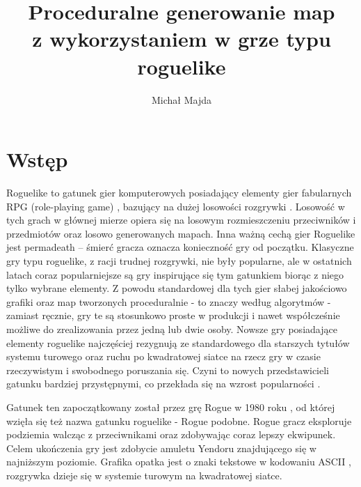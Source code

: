 \documentclass[12pt,twoside]{article}
\author{Michał Majda}
\title{Proceduralne generowanie map \\ z wykorzystaniem w grze typu roguelike }
\begin{document}
\maketitle

\blankpage
\tableofcontents
\clearpage
\blankpage


%

\section*{Wstęp}
Roguelike to gatunek gier komputerowych posiadający elementy gier fabularnych RPG (role-playing game) \cite{book_rpg}, bazujący na dużej losowości rozgrywki \cite{bookroguelike}. Losowość w tych grach w głównej mierze opiera się na losowym rozmieszczeniu przeciwników i przedmiotów oraz losowo generowanych mapach. Inna ważną cechą gier Roguelike jest permadeath -- śmierć gracza oznacza konieczność gry od początku. Klasyczne gry typu roguelike, z racji trudnej rozgrywki, nie były popularne, ale w ostatnich latach coraz popularniejsze są gry inspirujące się tym gatunkiem biorąc z niego tylko wybrane elementy. Z powodu standardowej dla tych gier słabej jakościowo grafiki oraz map tworzonych proceduralnie - to znaczy według algorytmów - zamiast ręcznie, gry te są stosunkowo proste w produkcji i nawet współcześnie możliwe do zrealizowania przez jedną lub dwie osoby. Nowsze gry posiadające elementy roguelike najczęściej rezygnują ze standardowego dla starszych tytułów systemu turowego oraz ruchu po kwadratowej siatce na rzecz gry w czasie rzeczywistym i swobodnego poruszania się. Czyni to nowych przedstawicieli gatunku bardziej przystępnymi, co przekłada się na wzrost popularności \cite{roguelike_popularity}.

Gatunek ten zapoczątkowany został przez grę Rogue w 1980 roku \cite{rogue_game}, od której wzięła się też nazwa gatunku roguelike - Rogue podobne. Rogue gracz eksploruje podziemia walcząc z przeciwnikami oraz zdobywając coraz lepszy ekwipunek. Celem ukończenia gry jest zdobycie amuletu Yendoru znajdującego się w najniższym poziomie. Grafika opatka jest o znaki tekstowe w kodowaniu ASCII \cite{book_ascii}, rozgrywka dzieje się w systemie turowym na kwadratowej siatce.
\end{document}
